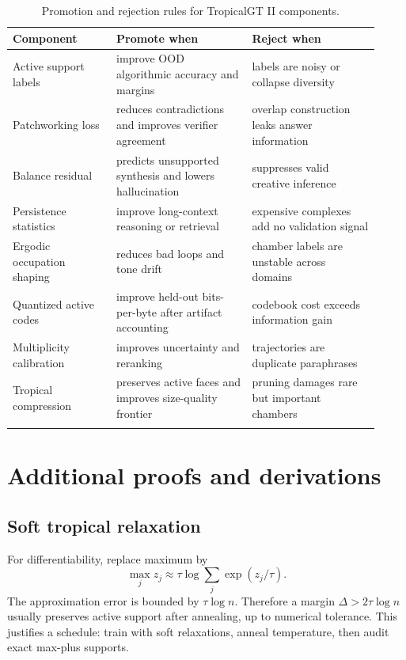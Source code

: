 \documentclass[11pt]{article}
\begin{document}
\begin{longtable}{p{0.26\linewidth}p{0.34\linewidth}p{0.32\linewidth}}
\toprule
Component & Promote when & Reject when \\
\midrule
Active support labels & improve OOD algorithmic accuracy and margins & labels are noisy or collapse diversity \\
Patchworking loss & reduces contradictions and improves verifier agreement & overlap construction leaks answer information \\
Balance residual & predicts unsupported synthesis and lowers hallucination & suppresses valid creative inference \\
Persistence statistics & improve long-context reasoning or retrieval & expensive complexes add no validation signal \\
Ergodic occupation shaping & reduces bad loops and tone drift & chamber labels are unstable across domains \\
Quantized active codes & improve held-out bits-per-byte after artifact accounting & codebook cost exceeds information gain \\
Multiplicity calibration & improves uncertainty and reranking & trajectories are duplicate paraphrases \\
Tropical compression & preserves active faces and improves size-quality frontier & pruning damages rare but important chambers \\
\bottomrule
\caption{Promotion and rejection rules for TropicalGT II components.}
\end{longtable}

\appendix

\section{Additional proofs and derivations}

\subsection{Soft tropical relaxation}

For differentiability, replace maximum by
\begin{equation}
\max_j z_j\approx \tau\log\sum_j\exp(z_j/\tau).
\end{equation}
The approximation error is bounded by \(\tau\log n\).  Therefore a margin \(\Delta>2\tau\log n\) usually preserves active support after annealing, up to numerical tolerance.  This justifies a schedule: train with soft relaxations, anneal temperature, then audit exact max-plus supports.
\end{document}
